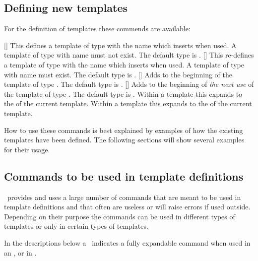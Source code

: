 \documentclass{acro-manual}
\begin{document}
\subsection{Defining new templates}\label{sec:defin-new-templ}
For the definition of templates these commends are available:
\begin{commands}
  []
    This defines a template of type  with the name 
    which inserts  when used.  A template of type  with
    name  must not exist.  The default type is .
  []
    This re-defines a template of type  with the name 
    which inserts  when used.  A template of type  with
    name  must exist.  The default type is .
  []
    Adds  to the beginning of the template
     of type .  The default type is .
  []
    Adds  to the beginning of \emph{the next use}
    of the template  of type .  The default type is
    .
  \expandable{}
    Within a template this expands to the  of the current
    template.
  \expandable{}
    Within a template this expands to the  of the current
    template.
\end{commands}

How to use these commands is best explained by examples of how the existing
templates have been defined.  The following sections will show several
examples for their usage.

\subsection{Commands to be used in template definitions}

\acro\ provides and uses a large number of commands that are meant to be used
in template definitions and that often are useless or will raise errors if
used outside.  Depending on their purpose the commands can be used in
different types of templates or only in certain types of templates.

In the descriptions below a \expandablesymbol\ indicates a fully expandable
command when used in an ,  or in .
\end{document}
